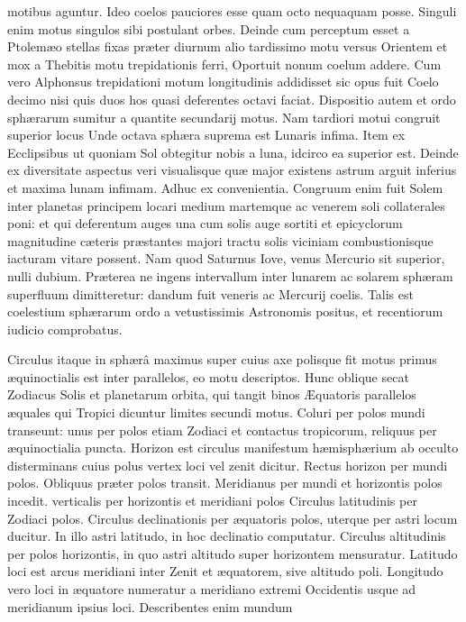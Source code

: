 \documentclass[11pt,a4paper]{article}
\begin{document}
motibus aguntur. Ideo coelos pauciores esse quam octo nequaquam posse. Singuli enim motus singulos sibi postulant orbes. Deinde cum perceptum esset a Ptolemæo stellas fixas præter diurnum alio tardissimo motu versus Orientem et mox a Thebitis motu trepidationis ferri, Oportuit nonum coelum addere. Cum vero Alphonsus trepidationi motum longitudinis addidisset sic opus fuit Coelo decimo nisi quis duos hos quasi deferentes octavi faciat. Dispositio autem et ordo sphærarum sumitur a quantite secundarij motus.
Nam tardiori motui congruit superior locus Unde octava sphæra suprema est Lunaris infima. Item ex Ecclipsibus ut quoniam Sol obtegitur nobis a luna, idcirco ea superior est. Deinde ex diversitate aspectus veri visualisque quæ major existens astrum arguit inferius et maxima lunam infimam. Adhuc ex convenientia. Congruum enim fuit Solem inter planetas principem locari medium martemque ac venerem soli collaterales poni: et qui deferentum auges una cum solis auge sortiti et epicyclorum magnitudine cæteris præstantes majori tractu solis viciniam combustionisque iacturam vitare possent. Nam quod Saturnus Iove, venus Mercurio sit superior, nulli dubium. Præterea ne ingens intervallum inter lunarem ac solarem sphæram superfluum dimitteretur: dandum fuit veneris ac Mercurij coelis. Talis est coelestium sphærarum ordo a vetustissimis Astronomis positus, et recentiorum iudicio comprobatus.

Circulus itaque in sphærâ maximus super cuius axe polisque fit motus primus æquinoctialis est inter parallelos, eo motu descriptos. Hunc oblique secat Zodiacus Solis et planetarum orbita, qui tangit binos Æquatoris parallelos æquales qui Tropici dicuntur limites secundi motus. Coluri per polos mundi transeunt: unus per polos etiam Zodiaci et contactus tropicorum, reliquus per æquinoctialia puncta. Horizon est circulus manifestum hæmisphærium ab occulto disterminans cuius polus vertex loci vel zenit dicitur. Rectus horizon per mundi polos. Obliquus præter polos transit. Meridianus per mundi et horizontis polos incedit. verticalis per horizontis et meridiani polos Circulus latitudinis per Zodiaci polos. Circulus declinationis per æquatoris polos, uterque per astri locum ducitur. In illo astri latitudo, in hoc declinatio computatur. Circulus altitudinis per polos  horizontis, in quo astri altitudo super horizontem mensuratur. Latitudo loci est arcus meridiani inter Zenit et æquatorem, sive altitudo poli. Longitudo vero loci in æquatore numeratur a meridiano extremi Occidentis usque ad meridianum ipsius loci. Describentes enim mundum
\end{document}
